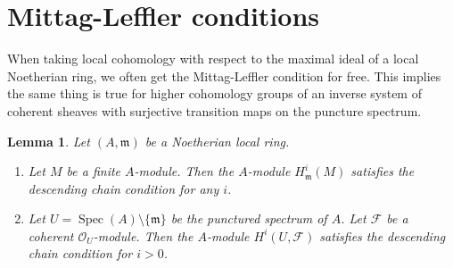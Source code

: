 \documentclass{stacks-project}
\theoremstyle{plain}
\newtheorem{lemma}[subsection]{Lemma}
\theoremstyle{definition}
\theoremstyle{remark}
\numberwithin{equation}{subsection}
\def\Spec{\mathop{\mathrm{Spec}}}
\begin{document}
\section{Mittag-Leffler conditions}
\label{section-ML}

\noindent
When taking local cohomology with respect to the maximal ideal
of a local Noetherian ring, we often get the Mittag-Leffler condition
for free. This implies the same thing is true for higher cohomology
groups of an inverse system of coherent sheaves with surjective transition
maps on the puncture spectrum.

\begin{lemma}
\label{lemma-descending-chain}
Let $(A, \mathfrak m)$ be a Noetherian local ring.
\begin{enumerate}
\item Let $M$ be a finite $A$-module. Then the $A$-module
$H^i_\mathfrak m(M)$ satisfies the descending chain condition
for any $i$.
\item Let $U = \Spec(A) \setminus \{\mathfrak m\}$ be the
punctured spectrum of $A$.
Let $\mathcal{F}$ be a coherent $\mathcal{O}_U$-module.
Then the $A$-module $H^i(U, \mathcal{F})$
satisfies the descending chain condition for $i > 0$.
\end{enumerate}
\end{lemma}
\end{document}
